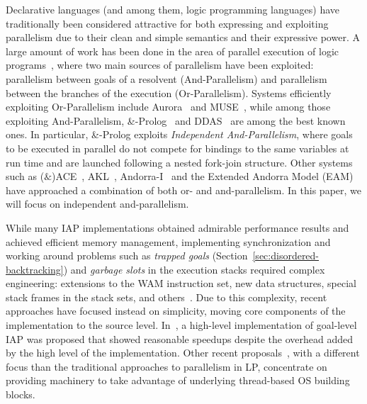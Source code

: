 \documentclass{tlp}
\newcounter{mnotei} \setcounter{mnotei}{0}
\newcommand{\mnote}[1]{{\scriptsize\textsf{\textcolor{blue}{$^{[\themnotei]}$}}}\marginpar{\scriptsize\textsf{\textcolor{red}{n.\themnotei: #1}}}\stepcounter{mnotei} }
\renewcommand{\mnote}[1]{}
\begin{document}
Declarative languages (and among them, logic programming languages)
have traditionally been considered attractive for both expressing and
exploiting parallelism due to their clean and simple 
semantics and their expressive power.  A
large amount of work has been done in the area of parallel execution of
logic programs~\cite{partut-toplas}, where two main sources of
parallelism have been exploited: parallelism between goals of a
resolvent (And-Parallelism) and parallelism between the branches 
of the execution (Or-Parallelism).
Systems efficiently exploiting Or-Parallelism include 
Aurora~\cite{aurora} and MUSE~\cite{muse},
while among those 
exploiting
And-Parallelism,
\&-Prolog~\cite{ngc-and-prolog} and DDAS~\cite{ddas-jlp} are among the
best known ones.  In particular, \&-Prolog exploits \emph{Independent
  And-Parallelism}, where goals to be executed in parallel do not 
compete for bindings to the same variables at run time and are
launched following a nested fork-join structure.
Other systems such as ($\&$)ACE~\cite{and-ace-ipps95},
AKL~\cite{sverker-phd}, Andorra-I~\cite{vitor-phd} and the Extended
Andorra Model (EAM)~\cite{eam91,BEAMTPLP2011} have approached a combination of
both or- and and-parallelism. In this paper, we will focus on
independent and-parallelism.

While many IAP implementations
obtained
admirable performance results and achieved efficient memory management, 
implementing synchronization and 
working around problems such as
\emph{trapped goals} (Section~\ref{sec:disordered-backtracking}) and
\emph{garbage slots} in the execution stacks required complex
engineering: extensions to the WAM instruction set, new data
structures,  special stack frames in the stack sets, and
others~\cite{hermenegildo-phd-short}.  Due to this complexity, 
recent approaches have focused instead on simplicity, moving core
components of the implementation to the source level.
In~\cite{hlfullandpar-iclp2008}, a high-level implementation of
goal-level IAP was proposed that showed reasonable speedups despite
the overhead added by the high level of the implementation.
Other recent proposals~\cite{moura08:padl}, with a different focus
than the traditional approaches to parallelism in LP, concentrate
on providing machinery to take advantage of underlying thread-based
OS building blocks.\mnote{We may
  remove this sentence / ref. if we are short in space.}
\end{document}
